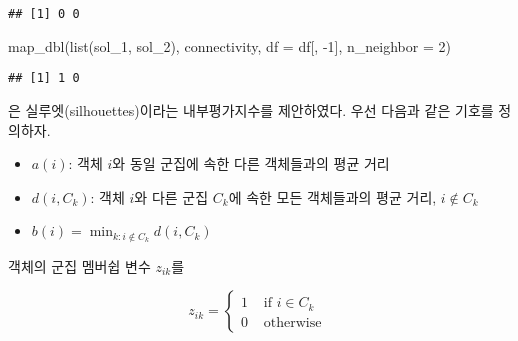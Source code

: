 \documentclass[
]{book}
\newenvironment{Shaded}{\begin{snugshade}}{\end{snugshade}}
\newcommand{\AttributeTok}[1]{\textcolor[rgb]{0.77,0.63,0.00}{#1}}
\newcommand{\CommentTok}[1]{\textcolor[rgb]{0.56,0.35,0.01}{\textit{#1}}}
\newcommand{\DecValTok}[1]{\textcolor[rgb]{0.00,0.00,0.81}{#1}}
\newcommand{\FunctionTok}[1]{\textcolor[rgb]{0.00,0.00,0.00}{#1}}
\newcommand{\NormalTok}[1]{#1}
\newcommand{\SpecialCharTok}[1]{\textcolor[rgb]{0.00,0.00,0.00}{#1}}
\providecommand{\tightlist}{%
  \setlength{\itemsep}{0pt}\setlength{\parskip}{0pt}}
\begin{document}
\begin{Shaded}
\end{Shaded}

\begin{verbatim}
## [1] 0 0
\end{verbatim}

\begin{Shaded}
\begin{Highlighting}[]
\FunctionTok{map\_dbl}\NormalTok{(}\FunctionTok{list}\NormalTok{(sol\_1, sol\_2), connectivity, }\AttributeTok{df =}\NormalTok{ df[, }\SpecialCharTok{{-}}\DecValTok{1}\NormalTok{], }\AttributeTok{n\_neighbor =} \DecValTok{2}\NormalTok{)}
\end{Highlighting}
\end{Shaded}

\begin{verbatim}
## [1] 1 0
\end{verbatim}

\citet{rousseeuw1987silhouettes} 은 실루엣(silhouettes)이라는 내부평가지수를 제안하였다. 우선 다음과 같은 기호를 정의하자.

\begin{itemize}
\tightlist
\item
  \(a(i)\): 객체 \(i\)와 동일 군집에 속한 다른 객체들과의 평균 거리
\item
  \(d(i, C_k)\): 객체 \(i\)와 다른 군집 \(C_k\)에 속한 모든 객체들과의 평균 거리, \(i \notin C_k\)
\item
  \(b(i) = \min_{k: i \notin C_k} d(i, C_k)\)
\end{itemize}

객체의 군집 멤버쉽 변수 \(z_{ik}\)를

\begin{equation*}
z_{ik} = \begin{cases}
1 & \text{ if } i \in C_k\\
0 & \text{ otherwise }
\end{cases}
\end{equation*}
\end{document}
